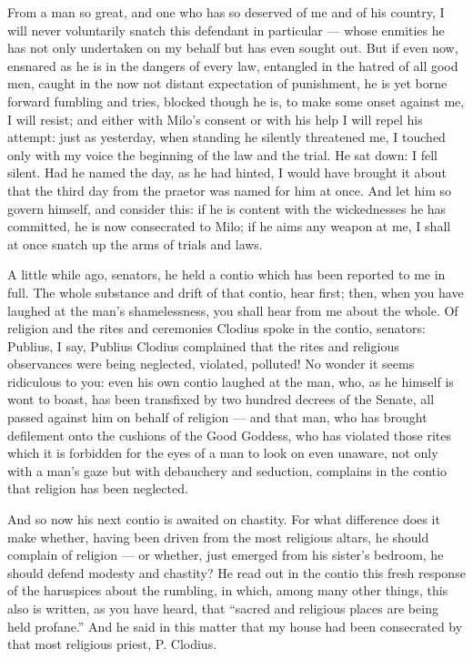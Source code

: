  From a man so great, and one who has so deserved of me and of his country, I will never voluntarily snatch this defendant in particular --- whose enmities he has not only undertaken on my behalf but has even sought out. But if even now, ensnared as he is in the dangers of every law, entangled in the hatred of all good men, caught in the now not distant expectation of punishment, he is yet borne forward fumbling and tries, blocked though he is, to make some onset against me, I will resist; and either with Milo's consent or with his help I will repel his attempt: just as yesterday, when standing he silently threatened me, I touched only with my voice the beginning of the law and the trial. He sat down: I fell silent. Had he named the day, as he had hinted, I would have brought it about that the third day from the praetor was named for him at once. And let him so govern himself, and consider this: if he is content with the wickednesses he has committed, he is now consecrated to Milo; if he aims any weapon at me, I shall at once snatch up the arms of trials and laws.

 A little while ago, senators, he held a contio which has been reported to me in full. The whole substance and drift of that contio, hear first; then, when you have laughed at the man's shamelessness, you shall hear from me about the whole. Of religion and the rites and ceremonies Clodius spoke in the contio, senators: Publius, I say, Publius Clodius complained that the rites and religious observances were being neglected, violated, polluted! No wonder it seems ridiculous to you: even his own contio laughed at the man, who, as he himself is wont to boast, has been transfixed by two hundred decrees of the Senate, all passed against him on behalf of religion --- and that man, who has brought defilement onto the cushions of the Good Goddess, who has violated those rites which it is forbidden for the eyes of a man to look on even unaware, not only with a man's gaze but with debauchery and seduction, complains in the contio that religion has been neglected.

 And so now his next contio is awaited on chastity. For what difference does it make whether, having been driven from the most religious altars, he should complain of religion --- or whether, just emerged from his sister's bedroom, he should defend modesty and chastity? He read out in the contio this fresh response of the haruspices about the rumbling, in which, among many other things, this also is written, as you have heard, that ``sacred and religious places are being held profane.'' And he said in this matter that my house had been consecrated by that most religious priest, P. Clodius.

